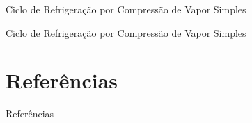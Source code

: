     \begin{frame}{Ciclo de Refrigeração por Compressão de Vapor Simples}\vspace*{-0em}
    \end{frame}

    \begin{frame}{Ciclo de Refrigeração por Compressão de Vapor Simples}\vspace*{-0em}
    \end{frame}


\section{Referências}

    \begin{frame}[allowframebreaks]{Referências -- }
        
        
    \end{frame}




